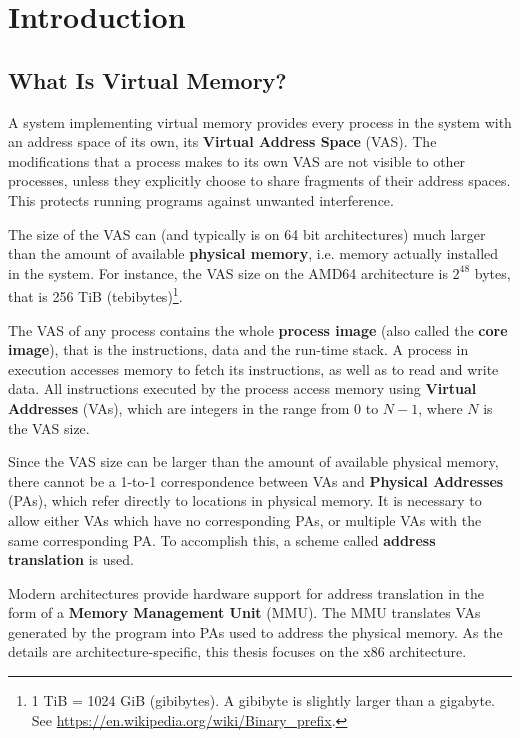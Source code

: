 \documentclass[shortabstract, english]{iithesis}
\author {Jakub Piecuch}
\begin{document}

\chapter{Introduction}

\section{What Is Virtual Memory?} \label{section:whatisvm}

A system implementing virtual memory provides every process in the system with
an address space of its own, its \textbf{Virtual Address Space} (VAS). The
modifications that a process makes to its own VAS are not visible to other
processes, unless they explicitly choose to share fragments of their address
spaces. This protects running programs against unwanted interference.

The size of the VAS can (and typically is on 64 bit architectures) much larger
than the amount of available \textbf{physical memory}, i.e. memory actually
installed in the system. For instance, the VAS size on the AMD64 architecture is
$2^{48}$ bytes, that is 256 TiB (tebibytes)\footnote{
  1 TiB = 1024 GiB (gibibytes). A gibibyte is slightly larger than a gigabyte. \\
  See \url{https://en.wikipedia.org/wiki/Binary_prefix}.}.

The VAS of any process contains the whole \textbf{process image} (also called
the \textbf{core image}), that is the instructions, data and the run-time stack.
A process in execution accesses memory to fetch its instructions, as well as to
read and write data. All instructions executed by the process access memory
using \textbf{Virtual Addresses} (VAs), which are integers in the range from 0
to $N-1$, where $N$ is the VAS size.

Since the VAS size can be larger than the amount of available physical memory,
there cannot be a 1-to-1 correspondence between VAs and \textbf{Physical
  Addresses} (PAs), which refer directly to locations in physical memory. It is
necessary to allow either VAs which have no corresponding PAs, or multiple VAs
with the same corresponding PA. To accomplish this, a scheme called
\textbf{address translation} is used.

Modern architectures provide hardware support for address translation in the
form of a \textbf{Memory Management Unit} (MMU). The MMU translates VAs
generated by the program into PAs used to address the physical memory. As the
details are architecture-specific, this thesis focuses on the x86 architecture.
\end{document}

